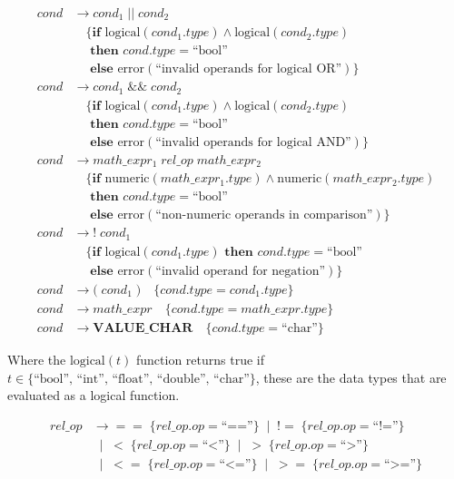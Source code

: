 \documentclass[letterpaper,12pt,oneside]{article}
\begin{document}
\begin{align*}
cond &\rightarrow cond_1 \; \mathbf{||} \; cond_2 \\
     &\quad \{\textbf{if } \text{logical}(cond_1.type) \land \text{logical}(cond_2.type) \\
     &\quad \textbf{ then } cond.type = \text{``bool''} \\
     &\quad \textbf{ else } \text{error}(\text{``invalid operands for logical OR''})\} \\[6pt]
cond &\rightarrow cond_1 \; \mathbf{\&\&} \; cond_2 \\
     &\quad \{\textbf{if } \text{logical}(cond_1.type) \land \text{logical}(cond_2.type) \\
     &\quad \textbf{ then } cond.type = \text{``bool''} \\
     &\quad \textbf{ else } \text{error}(\text{``invalid operands for logical AND''})\} \\[6pt]
cond &\rightarrow math\_expr_1 \; rel\_op \; math\_expr_2 \\
     &\quad \{\textbf{if } \text{numeric}(math\_expr_1.type) \land \text{numeric}(math\_expr_2.type) \\
     &\quad \textbf{ then } cond.type = \text{``bool''} \\
     &\quad \textbf{ else } \text{error}(\text{``non-numeric operands in comparison''})\} \\[6pt]
cond &\rightarrow \mathbf{!} \; cond_1 \\
     &\quad \{\textbf{if } \text{logical}(cond_1.type) \textbf{ then } cond.type = \text{``bool''} \\
     &\quad \textbf{ else } \text{error}(\text{``invalid operand for negation''})\} \\[6pt]
cond &\rightarrow \mathbf{(} \; cond_1 \; \mathbf{)} \quad \{cond.type = cond_1.type\} \\[6pt]
cond &\rightarrow math\_expr \quad \{cond.type = math\_expr.type\} \\[6pt]
cond &\rightarrow \mathbf{VALUE\_CHAR} \quad \{cond.type = \text{``char''}\}
\end{align*}

Where the $\text{logical}(t)$ function returns true if $t \in \{\text{``bool'', ``int'', ``float'', ``double'', ``char''}\}$, these are the data types that are evaluated as a logical function.

\begin{align*}
rel\_op &\rightarrow \mathbf{==} \;\{rel\_op.op = \text{``==''}\} \;\mid\; \mathbf{!=} \;\{rel\_op.op = \text{``!=''}\} \\
        &\;\mid\; \mathbf{<} \;\{rel\_op.op = \text{``<''}\} \;\mid\; \mathbf{>} \;\{rel\_op.op = \text{``>''}\} \\
        &\;\mid\; \mathbf{<=} \;\{rel\_op.op = \text{``<=''}\} \;\mid\; \mathbf{>=} \;\{rel\_op.op = \text{``>=''}\}
\end{align*}
\end{document}
